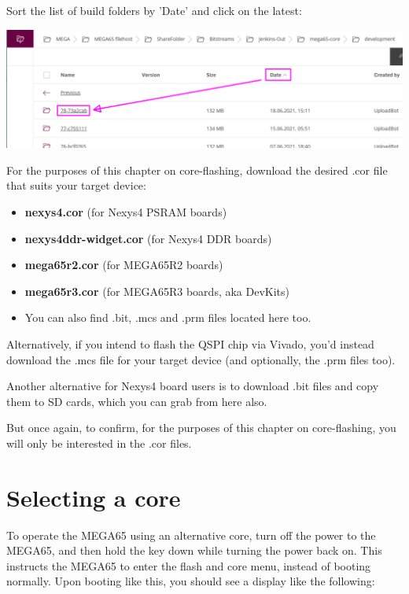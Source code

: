 Sort the list of build folders by 'Date' and click on the latest:

\includegraphics[width=\linewidth]{images/latest_bitstream.png}

For the purposes of this chapter on core-flashing, download the desired .cor file that suits your target device:

\begin{itemize}
  \item{\textbf{nexys4.cor} (for Nexys4 PSRAM boards)}
  \item{\textbf{nexys4ddr-widget.cor} (for Nexys4 DDR boards)}
  \item{\textbf{mega65r2.cor} (for MEGA65R2 boards)}
  \item{\textbf{mega65r3.cor} (for MEGA65R3 boards, aka DevKits)}
  \item{You can also find .bit, .mcs and .prm files located here too.}
\end{itemize}

Alternatively, if you intend to flash the QSPI chip via Vivado, you'd instead download the .mcs file for your target device (and optionally, the .prm files too).

Another alternative for Nexys4 board users is to download .bit files and copy them to SD cards, which you can grab from here also.

But once again, to confirm, for the purposes of this chapter on core-flashing, you will only be interested in the .cor files.

\section{Selecting a core}

To operate the MEGA65 using an alternative core, turn off the power to the MEGA65, and then hold the
 key down while turning the power back on.  This instructs the MEGA65 to enter the
flash and core menu, instead of booting normally. Upon booting like this, you should see a display like the following:

